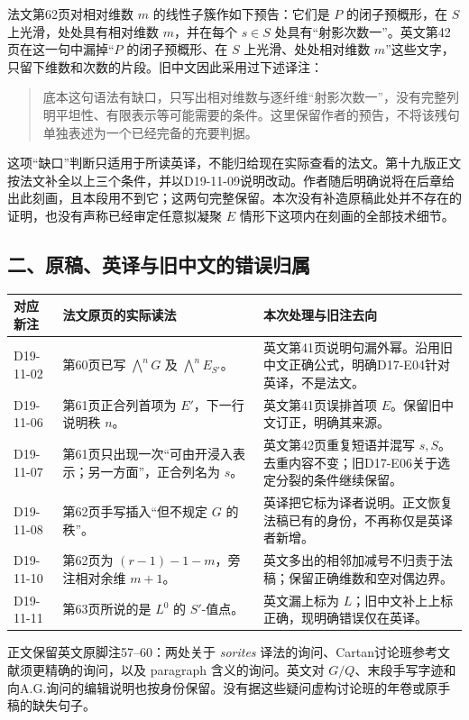 \documentclass[UTF8,a4paper]{ctexbook}
\begin{document}
法文第62页对相对维数 $m$ 的线性子簇作如下预告：它们是 $P$ 的闭子预概形，在 $S$ 上光滑，处处具有相对维数 $m$，并在每个 $s\in S$ 处具有“射影次数一”。英文第42页在这一句中漏掉“$P$ 的闭子预概形、在 $S$ 上光滑、处处相对维数 $m$”这些文字，只留下维数和次数的片段。旧中文因此采用过下述译注：
\begin{quote}
底本这句语法有缺口，只写出相对维数与逐纤维“射影次数一”，没有完整列明平坦性、有限表示等可能需要的条件。这里保留作者的预告，不将该残句单独表述为一个已经完备的充要判据。
\end{quote}
这项“缺口”判断只适用于所读英译，不能归给现在实际查看的法文。第十九版正文按法文补全以上三个条件，并以D19-11-09说明改动。作者随后明确说将在后章给出此刻画，且本段用不到它；这两句完整保留。本次没有补造原稿此处并不存在的证明，也没有声称已经审定任意拟凝聚 $E$ 情形下这项内在刻画的全部技术细节。

\subsection*{二、原稿、英译与旧中文的错误归属}

\begin{longtable}{@{}p{.18\linewidth}p{.34\linewidth}p{.40\linewidth}@{}}
\toprule
对应新注 & 法文原页的实际读法 & 本次处理与旧注去向\\
\midrule
\endhead
D19-11-02 & 第60页已写 $\bigwedge^nG$ 及 $\bigwedge^nE_{S'}$。 & 英文第41页说明句漏外幂。沿用旧中文正确公式，明确D17-E04针对英译，不是法文。\\
D19-11-06 & 第61页正合列首项为 $E'$，下一行说明秩 $n$。 & 英文第41页误排首项 $E$。保留旧中文订正，明确其来源。\\
D19-11-07 & 第61页只出现一次“可由开浸入表示；另一方面”，正合列名为 $s$。 & 英文第42页重复短语并混写 $s,S$。去重内容不变；旧D17-E06关于选定分裂的条件继续保留。\\
D19-11-08 & 第62页手写插入“但不规定 $G$ 的秩”。 & 英译把它标为译者说明。正文恢复法稿已有的身份，不再称仅是英译者新增。\\
D19-11-10 & 第62页为 $(r-1)-1-m$，旁注相对余维 $m+1$。 & 英文多出的相邻加减号不归责于法稿；保留正确维数和空对偶边界。\\
D19-11-11 & 第63页所说的是 $L^0$ 的 $S'$-值点。 & 英文漏上标为 $L$；旧中文补上上标正确，现明确错误仅在英译。\\
\bottomrule
\end{longtable}

正文保留英文原脚注57--60：两处关于 \textit{sorites} 译法的询问、Cartan讨论班参考文献须更精确的询问，以及 paragraph 含义的询问。英文对 $G/Q$、末段手写字迹和向A.G.询问的编辑说明也按身份保留。没有据这些疑问虚构讨论班的年卷或原手稿的缺失句子。
\end{document}

